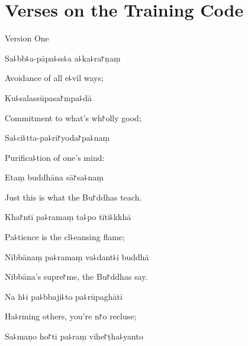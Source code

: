 \chapter{Verses on the Training Code}%



\begin{leader}
\end{leader}

\begin{instruction}
  Version One
\end{instruction}

Sa꜕bb꜕a-pāpa꜕ss꜕a a꜕ka꜕ra꜓ṇaṃ

\begin{english}
  Avoidance of all e꜕vil ways;
\end{english}

Ku꜕salassūpasa꜓mpa꜕dā

\begin{english}
  Commitment to what's wh꜓olly good;
\end{english}

Sa꜕ci꜕tta-pa꜕ri꜓yoda꜓pa꜕naṃ

\begin{english}
  Purifica꜕tion of one's mind:
\end{english}

Etaṃ buddhāna sā꜓sa꜕naṃ

\begin{english}
  Just this is what the Bu꜓ddhas teach.
\end{english}

Kha꜓ntī pa꜕ramaṃ ta꜕po tīti꜕kkhā

\begin{english}
  Pa꜕tience is the cl꜕eansing flame;
\end{english}

Nibbānaṃ pa꜕ramaṃ va꜕dant꜕i buddhā

\begin{english}
  Nibbāna's supre꜓me, the Bu꜓ddhas say.
\end{english}

Na h꜕i pa꜕bbaji꜕to pa꜕rūpaghātī

\begin{english}
  Ha꜕rming others, you're n꜓o recluse;
\end{english}

Sa꜕maṇo ho꜓ti pa꜕raṃ vihe꜓ṭha꜕yanto


